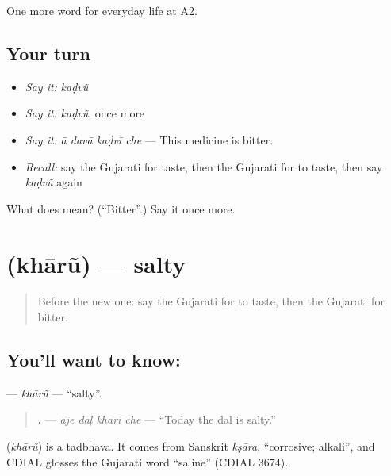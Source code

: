 \begin{grammarlens}[title={What you've built}]
One more word for everyday life at A2.
\end{grammarlens}

\subsection*{Your turn}
\begin{itemize}
\raggedright
  \item \emph{Say it:} \emph{kaḍvũ}
  \item \emph{Say it:} \emph{kaḍvũ}, once more
  \item \emph{Say it:} \emph{ā davā kaḍvī che} — This medicine is bitter.
  \item \emph{Recall:} say the Gujarati for taste, then the Gujarati for to taste, then say \emph{kaḍvũ} again
\end{itemize}

\begin{tcolorbox}[breakable,colback=teal!4,colframe=teal!35!black,title={Before you move on}]
What does  mean? (\textquotedblleft{}Bitter\textquotedblright{}.) Say it once more.
\end{tcolorbox}
\section[\texorpdfstring{\gu{ખારું} (khārũ)}{ખારું (khārũ)}]{ (khārũ) — salty}

\label{lesson:GU-C171-kharu}



\begin{quote}
Before the new one: say the Gujarati for to taste, then the Gujarati for bitter.
\end{quote}

\subsection*{You'll want to know: }
\textbf{} — \emph{khārũ} — \textquotedblleft{}salty\textquotedblright{}.

\begin{quote}
\textbf{   .} — \emph{āje dāḷ khārī che} — \textquotedblleft{}Today the dal is salty.\textquotedblright{}
\end{quote}

\begin{cousinweb}
\textbf{} (\emph{khārũ}) is a tadbhava. It comes from Sanskrit \emph{kṣāra}, \textquotedblleft{}corrosive; alkali\textquotedblright{}, and CDIAL glosses the Gujarati word \textquotedblleft{}saline\textquotedblright{} (CDIAL 3674).
\end{cousinweb}

